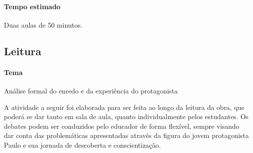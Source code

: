 \documentclass{extarticle}
\begin{document}
\paragraph{Tempo estimado} Duas aulas de 50 minutos.

\subsection{Leitura}


\paragraph{Tema} Análise formal do enredo e da experiência do protagonista
  
A atividade a seguir foi elaborada para ser feita ao longo da leitura
da obra, que poderá se dar tanto em sala de aula, quanto
individualmente pelos estudantes. Os debates podem ser conduzidos pelo
educador de forma flexível, sempre visando dar conta das problemáticas
apresentadas através da figura do jovem protagonista Paulo e sua
jornada de descoberta e conscientização.
\end{document}

